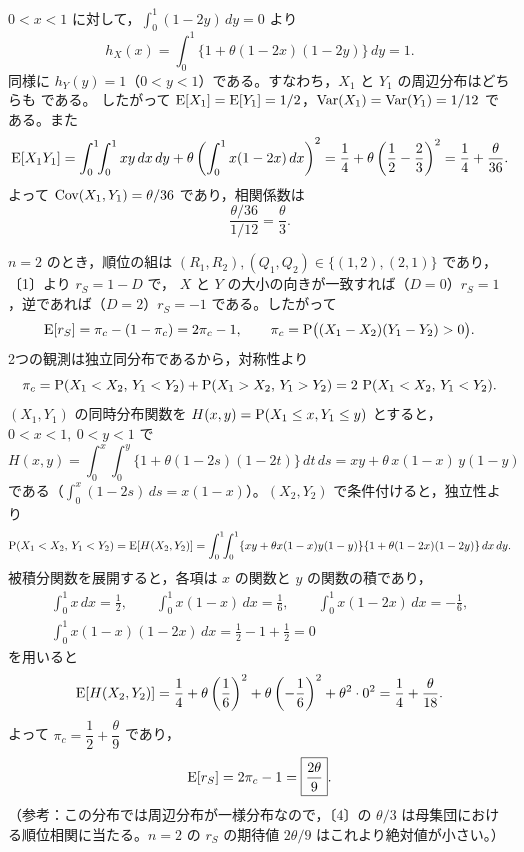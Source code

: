 \documentclass[a4paper,11pt]{ltjsarticle}
\begin{document}
$0<x<1$ に対して，$\int_0^1(1-2y)\,dy=0$ より
\[
h_X(x)=\int_0^1\{1+\theta(1-2x)(1-2y)\}\,dy=1 .
\]
同様に $h_Y(y)=1$（$0<y<1$）である。すなわち，$X_1$ と $Y_1$ の周辺分布はどちらも
 である。
したがって $\operatorname{E}[X_1]=\operatorname{E}[Y_1]=1/2$，$\operatorname{Var}(X_1)=\operatorname{Var}(Y_1)=1/12$ である。また
\[
\operatorname{E}[X_1Y_1]=\int_0^1\!\!\int_0^1xy\,dx\,dy+\theta\left(\int_0^1x(1-2x)\,dx\right)^2
=\frac14+\theta\left(\frac12-\frac23\right)^2=\frac14+\frac\theta{36}.
\]
よって $\operatorname{Cov}(X_1,Y_1)=\theta/36$ であり，相関係数は
\[
\frac{\theta/36}{1/12}=\boxed{\frac\theta3}.
\]

$n=2$ のとき，順位の組は $(R_1,R_2),(Q_1,Q_2)\in\{(1,2),(2,1)\}$ であり，〔1〕より $r_S=1-D$ で，
$X$ と $Y$ の大小の向きが一致すれば（$D=0$）$r_S=1$，逆であれば（$D=2$）$r_S=-1$ である。したがって
\[
\operatorname{E}[r_S]=\pi_c-(1-\pi_c)=2\pi_c-1,\qquad \pi_c=\operatorname{P}\bigl((X_1-X_2)(Y_1-Y_2)>0\bigr).
\]
2つの観測は独立同分布であるから，対称性より
\[
\pi_c=\operatorname{P}(X_1<X_2,\,Y_1<Y_2)+\operatorname{P}(X_1>X_2,\,Y_1>Y_2)=2\,\operatorname{P}(X_1<X_2,\,Y_1<Y_2).
\]
$(X_1,Y_1)$ の同時分布関数を $H(x,y)=\operatorname{P}(X_1\le x,Y_1\le y)$ とすると，$0<x<1,\ 0<y<1$ で
\[
H(x,y)=\int_0^x\!\!\int_0^y\{1+\theta(1-2s)(1-2t)\}\,dt\,ds=xy+\theta\,x(1-x)\,y(1-y)
\]
である（$\int_0^x(1-2s)\,ds=x(1-x)$）。$(X_2,Y_2)$ で条件付けると，独立性より
\[
\operatorname{P}(X_1<X_2,\,Y_1<Y_2)=\operatorname{E}[H(X_2,Y_2)]
=\int_0^1\!\!\int_0^1\{xy+\theta x(1-x)y(1-y)\}\{1+\theta(1-2x)(1-2y)\}\,dx\,dy .
\]
被積分関数を展開すると，各項は $x$ の関数と $y$ の関数の積であり，
\begin{gather*}
\int_0^1x\,dx=\frac12,\qquad
\int_0^1x(1-x)\,dx=\frac16,\qquad
\int_0^1x(1-2x)\,dx=-\frac16,\\
\int_0^1x(1-x)(1-2x)\,dx=\frac12-1+\frac12=0
\end{gather*}
を用いると
\[
\operatorname{E}[H(X_2,Y_2)]=\frac14+\theta\left(\frac16\right)^2+\theta\left(-\frac16\right)^2+\theta^2\cdot0^2=\frac14+\frac\theta{18}.
\]
よって $\pi_c=\dfrac12+\dfrac\theta9$ であり，
\[
\operatorname{E}[r_S]=2\pi_c-1=\boxed{\frac{2\theta}9}.
\]
（参考：この分布では周辺分布が一様分布なので，〔4〕の $\theta/3$ は母集団における順位相関に当たる。$n=2$ の $r_S$ の期待値 $2\theta/9$ はこれより絶対値が小さい。）
\newpage
\end{document}

